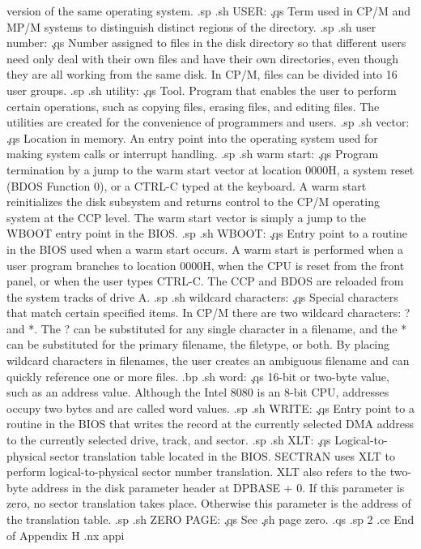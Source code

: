 version of the same operating system.
.sp
.sh
USER:  \c
.qs
Term used in CP/M and MP/M systems to distinguish distinct 
regions of the directory.
.sp
.sh
user number:  \c
.qs
Number assigned to files in the disk directory so that different 
users need only deal with their own files and have their own 
directories, even though they are all working from the same disk.  
In CP/M, files can be divided into 16 user groups.
.sp
.sh
utility:  \c
.qs
Tool.  Program that enables the user to perform certain 
operations, such as copying files, erasing files, and editing 
files.  The utilities are created for the convenience of 
programmers and users.
.sp
.sh
vector:  \c
.qs
Location in memory.  An entry point into the operating system 
used for making system calls or interrupt handling.
.sp
.sh
warm start:  \c
.qs
Program termination by a jump to the warm start vector at 
location 0000H, a system reset (BDOS Function 0), or a CTRL-C 
typed at the keyboard.  A warm start reinitializes the disk 
subsystem and returns control to the CP/M operating system at the 
CCP level.  The warm start vector is simply a jump to the WBOOT 
entry point in the BIOS.
.sp
.sh
WBOOT:  \c
.qs
Entry point to a routine in the BIOS used when a warm start 
occurs.  A warm start is performed when a user program branches 
to location 0000H, when the CPU is reset from the front panel, or 
when the user types CTRL-C.  The CCP and BDOS are reloaded from 
the system tracks of drive A.
.sp
.sh
wildcard characters:  \c
.qs
Special characters that match certain specified items.  In CP/M 
there are two wildcard characters:  ? and *.  The ? can be 
substituted for any single character in a filename, and the * can 
be substituted for the primary filename, the filetype, or both.  
By placing wildcard characters in filenames, the user creates an 
ambiguous filename and can quickly reference one or more files.
.bp
.sh
word:  \c
.qs
16-bit or two-byte value, such as an address value.  Although the 
Intel 8080 is an 8-bit CPU, addresses occupy two bytes and are 
called word values.
.sp
.sh
WRITE:  \c
.qs
Entry point to a routine in the BIOS that writes the record at 
the currently selected DMA address to the currently selected 
drive, track, and sector.
.sp
.sh
XLT:  \c
.qs
Logical-to-physical sector translation table located in the BIOS.  
SECTRAN uses XLT to perform logical-to-physical sector number 
translation.  XLT also refers to the two-byte address in the disk 
parameter header at DPBASE + 0.  If this parameter is zero, no 
sector translation takes place.  Otherwise this parameter is the 
address of the translation table.
.sp
.sh
ZERO PAGE:  \c
.qs
See \c
.sh
page zero.
.qs
.sp 2
.ce
End of Appendix H
.nx appi
